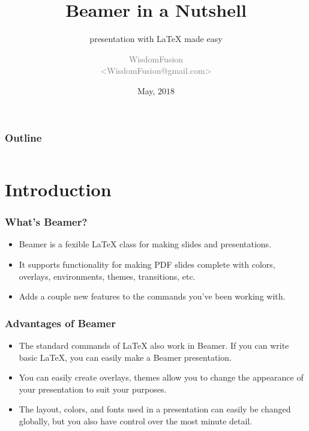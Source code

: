 \documentclass[aspectratio=169,utf8]{ctexbeamer}
\title[Beamer Tutorial]{Beamer in a Nutshell}
\subtitle{presentation with \LaTeX{} made easy}
\author[WisdomFusion]{\scriptsize \textcolor{gray}{WisdomFusion\\ <WisdomFusion@gmail.com>}}
\date{May, $2018$}
\begin{document}
\addtocounter{framenumber}{-1}


\begin{frame}
  \titlepage
\end{frame}

\begin{frame}
  \frametitle{Outline}

  \centering

  \begin{minipage}{.75\textwidth}

    \begin{columns}[t]
      \begin{column}{.5\textwidth}
        \tableofcontents[sections={1-5}]
      \end{column}
      \begin{column}{.5\textwidth}
        \tableofcontents[sections={6-10}]
      \end{column}      
    \end{columns}

  \end{minipage}

\end{frame}


\section{Introduction}

\begin{frame}
  \frametitle{What's Beamer?}

  \begin{itemize}
    \setlength{\itemsep}{8pt}
    \item Beamer is a fexible \LaTeX{} class for making slides and presentations.
    \item It supports functionality for making PDF slides complete with colors, overlays, environments, themes, transitions, etc.
    \item Adds a couple new features to the commands you've been working with.
  \end{itemize}
  
\end{frame}


\begin{frame}
  \frametitle{Advantages of Beamer}

  \begin{itemize}
    \setlength{\itemsep}{8pt}
    \item The standard commands of \LaTeX{} also work in Beamer. If you can write basic \LaTeX{}, you can easily make a Beamer presentation.
    \item You can easily create overlays, themes allow you to change the appearance of your presentation to suit your purposes.
    \item The layout, colors, and fonts used in a presentation can easily be changed globally, but you also have control over the most minute detail.
  \end{itemize}
  
\end{frame}
\end{document}
